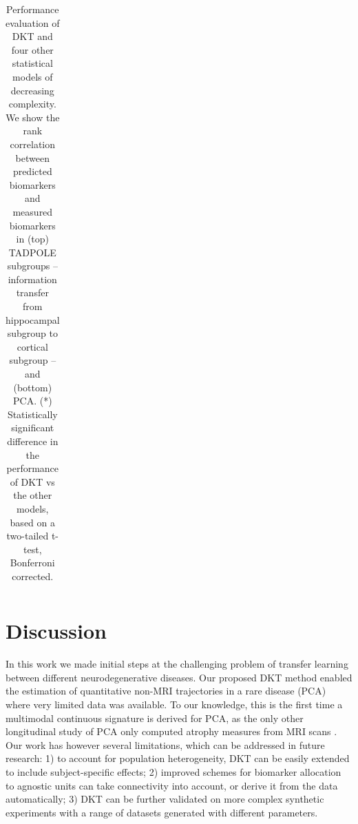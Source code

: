 \documentclass{llncs}
\begin{document}
\begin{table}
\begin{tabular}{c | c c c c c c}
\end{tabular}
\vspace{0.5em}
\caption[Performance evaluation of DKT and other models]{Performance evaluation of DKT and four other statistical models of decreasing complexity. We show the rank correlation between predicted biomarkers and measured biomarkers in (top) TADPOLE subgroups -- information transfer from hippocampal subgroup to cortical subgroup -- and (bottom) PCA. (*) Statistically significant difference in the performance of DKT vs the other models, based on a two-tailed t-test, Bonferroni corrected.}
\label{sec:dktPerfMetrics}
\end{table}



\section{Discussion}
\label{sec:dktDis}

In this work we made initial steps at the challenging problem of transfer learning between different neurodegenerative diseases. Our proposed DKT method enabled the estimation of quantitative non-MRI trajectories in a rare disease (PCA) where very limited data was available. To our knowledge, this is the first time a multimodal continuous signature is derived for PCA, as the only other longitudinal study of PCA only computed atrophy measures from MRI scans \cite{lehmann2011cortical}. Our work has however several limitations, which can be addressed in future research: 1) to account for population heterogeneity, DKT can be easily extended to include subject-specific effects; 2) improved schemes for biomarker allocation to agnostic units can take connectivity into account, or derive it from the data automatically; 3) DKT can be further validated on more complex synthetic experiments with a range of datasets generated with different parameters.

\end{document}
